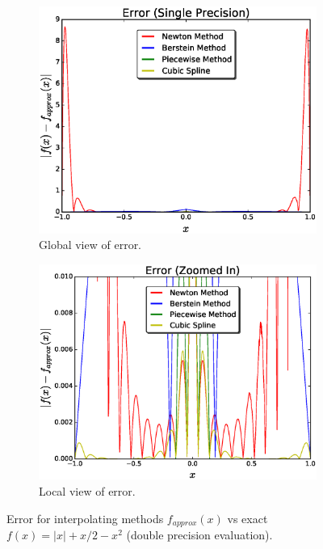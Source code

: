 \documentclass[12pt]{article}
\theoremstyle{remark}
\begin{document}
\begin{figure}[H]
	\centering
	\begin{subfigure}{.5\textwidth}
		\centering
		\includegraphics[width=1.1\linewidth]{NerrorFig3.eps}
		\caption{Global view of error.}
		\label{fig:sub1}
	\end{subfigure}%
	\begin{subfigure}{.5\textwidth}
		\centering
		\includegraphics[width=1.1\linewidth]{NerrorFigg3.eps}
		\caption{Local view of error.}
		\label{fig:sub2}
	\end{subfigure}
	\caption{Error for interpolating methods $f_{approx}(x)$ vs exact $f(x) = \vert x \vert + x/2 - x^2$ (double precision evaluation). }
	\label{fig:test}
\end{figure}
\end{document}

